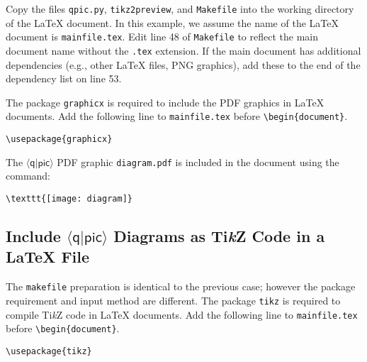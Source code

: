 \documentclass[twoside,12pt]{article}
\newcommand{\qpic}{$\langle\mathsf{q}|\mathsf{pic}\rangle$\xspace}
\newcommand{\TikZ}{Ti\emph{k}Z\xspace}
\begin{document}
Copy the files {\tt qpic.py}, {\tt tikz2preview}, and {\tt Makefile} into the working directory of the {\LaTeX} document. In this example, we assume the name of the {\LaTeX} document is {\tt mainfile.tex}. Edit line 48 of {\tt Makefile} to reflect the main document name without the {\tt .tex} extension. If the main document has additional dependencies (e.g., other {\LaTeX} files, PNG graphics), add these to the end of the dependency list on line 53.

\begin{minipage}{5in}

\end{minipage}


The package {\tt graphicx} is required to include the PDF graphics in {\LaTeX} documents.
Add the following line to {\tt mainfile.tex} before \verb|\begin{document}|.

\begin{minipage}{5in}
\begin{lstlisting}[basicstyle=\normalsize\ttfamily]
\usepackage{graphicx}
\end{lstlisting}
\end{minipage}


The \qpic PDF graphic {\tt diagram.pdf} is included in the document using the command:

\begin{minipage}{5in}
\begin{lstlisting}[basicstyle=\normalsize\ttfamily]
\texttt{[image: diagram]}
\end{lstlisting}
\end{minipage}

\subsection{Include \qpic Diagrams as \TikZ Code in a {\LaTeX} File}

The {\tt makefile} preparation is identical to the previous case; however the package requirement and input method are different. The package {\tt tikz} is required to compile \TikZ code in {\LaTeX} documents.
Add the following line to {\tt mainfile.tex} before \verb|\begin{document}|.

\begin{minipage}{5in}
\begin{lstlisting}[basicstyle=\normalsize\ttfamily]
\usepackage{tikz}
\end{lstlisting}
\end{minipage}
\end{document}
